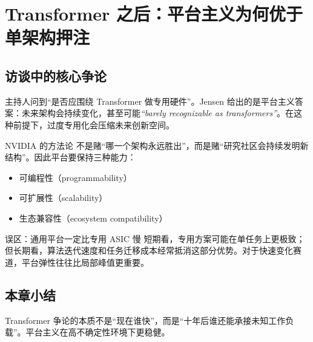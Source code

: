 \section{Transformer 之后：平台主义为何优于单架构押注}

\subsection{访谈中的核心争论}

主持人问到“是否应围绕 Transformer 做专用硬件”。Jensen 给出的是平台主义答案：未来架构会持续变化，甚至可能\textit{``barely recognizable as transformers''}。在这种前提下，过度专用化会压缩未来创新空间。

\begin{importantbox}{NVIDIA 的方法论}
不是赌“哪一个架构永远胜出”，而是赌“研究社区会持续发明新结构”。因此平台要保持三种能力：
\begin{itemize}
    \item 可编程性（programmability）
    \item 可扩展性（scalability）
    \item 生态兼容性（ecosystem compatibility）
\end{itemize}
\end{importantbox}

\begin{warningbox}{误区：通用平台一定比专用 ASIC 慢}
短期看，专用方案可能在单任务上更极致；但长期看，算法迭代速度和任务迁移成本经常抵消这部分优势。对于快速变化赛道，平台弹性往往比局部峰值更重要。
\end{warningbox}

\subsection{本章小结}
Transformer 争论的本质不是“现在谁快”，而是“十年后谁还能承接未知工作负载”。平台主义在高不确定性环境下更稳健。

